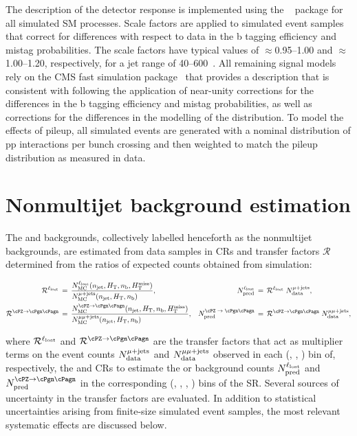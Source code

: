 The description of the detector response is implemented using the
\GEANTfour~\cite{geant} package for all simulated SM processes. Scale
factors are applied to simulated event samples that correct for
differences with respect to data in the b tagging efficiency and
mistag probabilities. The scale factors have typical values of
${\approx}$0.95--1.00 and ${\approx}$1.00--1.20, respectively, for a
jet \pt range of 40--600\GeV~\cite{BTV-16-002}. All remaining signal
models rely on the CMS fast simulation package~\cite{fastsim} that
provides a description that is consistent with \GEANTfour following
the application of near-unity corrections for the differences in the b
tagging efficiency and mistag probabilities, as well as corrections
for the differences in the modelling of the \mht distribution. To
model the effects of pileup, all simulated events are generated with a
nominal distribution of pp interactions per bunch crossing and then
weighted to match the pileup distribution as measured in data.

\section{Nonmultijet background estimation}
\label{sec:ewk}

The \lost and \znunuj backgrounds, collectively labelled henceforth as
the nonmultijet backgrounds, are estimated from data samples in CRs
and transfer factors $\mathcal{R}$ determined from the ratios of
expected counts obtained from simulation:

\begin{align}
  \tf^{\lost} \, & = \,
  \frac{N^{\lost}_\text{MC}(\njet, \scalht, \nb, \mht)}
  {N^{\mj}_\text{MC}(\njet, \scalht, \nb)\hfill},
  & 
  N^{\lost}_\text{pred} \, & = \,
  \tf^{\lost} \; N^{\mj}_\text{data},
  \\
  \tf^{\znunu} \, & = \,
  \frac{N^{\znunu}_\text{MC}(\njet, \scalht, \nb, \mht)}
  {N^{\mmj}_\text{MC}(\njet, \scalht, \nb)\hfill},
  & 
  N^\text{\znunu}_\text{pred} \, & = \,
  \tf^{\znunu} \; N^{\mmj}_\text{data},
\end{align}

where $\mathcal{R}^{\ell_\text{lost}}$ and $\tf^{\znunu}$ are the transfer factors that
act as multiplier terms on the event counts $N^{\mu\text{+\ensuremath{\text{jets}}}}_\text{data}$ and
$N^{\mu\mu\text{+\ensuremath{\text{jets}}}}_\text{data}$ observed in each (\njet, \scalht, \nb) bin of,
respectively, the \mj and \mmj CRs to estimate the \lost or \znunuj
background counts $N^{\ell_\text{lost}}_\text{pred}$ and $N^{\znunu}_\text{pred}$
in the corresponding (\njet, \scalht, \nb, \mht) bins of the
SR. Several sources of uncertainty in the transfer factors are
evaluated.  In addition to statistical uncertainties arising from
finite-size simulated event samples, the most relevant systematic
effects are discussed below.

